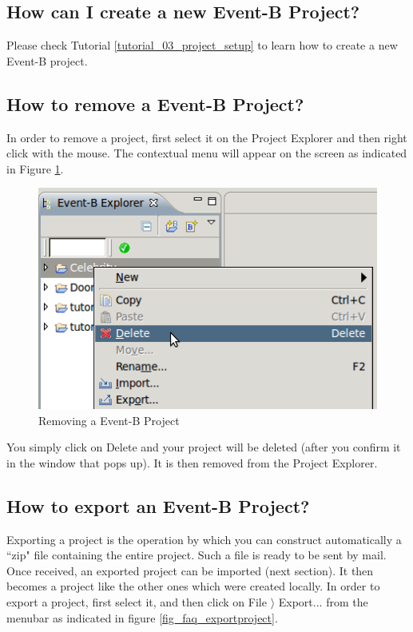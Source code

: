 \subsection{How can I create a new Event-B Project?}

Please check Tutorial \ref{tutorial_03_project_setup} to learn how to create a new Event-B project.

\subsection{How to remove a Event-B Project?}

In order to remove a project, first select it on the \textsf{Project Explorer} and then right click with the mouse. The contextual menu will appear on the screen as indicated in Figure \ref{fig_faq_removeproject}.

\begin{figure}[!h]
\begin{center}
	\includegraphics{img/faq/faq_removeproject.png}
	\caption{Removing a Event-B Project}
	\label{fig_faq_removeproject}
\end{center}
\end{figure}

You simply click on \textsf{Delete} and your project will be deleted (after you confirm it in the window that pops up). It is then removed from the \textsf{Project Explorer}.

\subsection{How to export an Event-B Project?}

Exporting a project is the operation by which you can construct automatically a ``zip" file containing the entire project. Such a file is ready to be sent by mail. Once received, an exported project can be imported (next section). It then becomes a project like the other ones which were created locally. In order to export a project, first select it, and then click on \textsf{File $\rangle$ Export...} from the menubar as indicated in figure \ref{fig_faq_exportproject}. 

